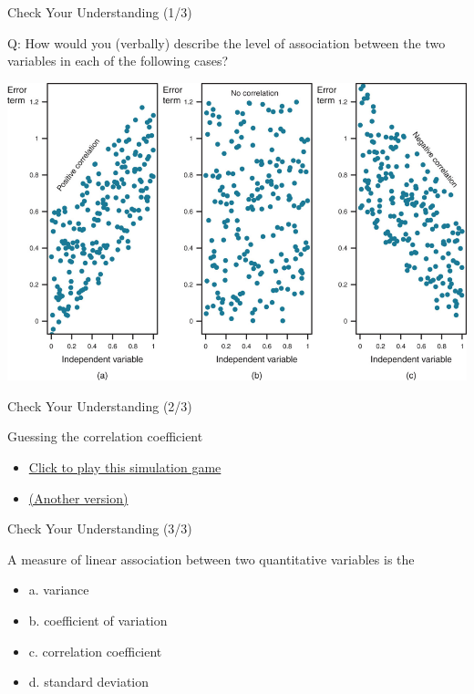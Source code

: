 \documentclass{beamer}
\begin{document}
\begin{frame}{Check Your Understanding (1/3)}
\vspace{0.2 cm}

\begin{center}

Q: How would you (verbally) describe the level of association between the two variables in each of the following cases?
\vspace{0.5 cm}

\includegraphics[scale=0.5]{images/correlationsAllSorts.png}
\end{center}

\end{frame}



\begin{frame}{Check Your Understanding (2/3)}

Guessing the correlation coefficient

\begin{itemize}
\item \href{https://www.rossmanchance.com/applets/GuessCorrelation.html}{Click to play this simulation game}
\item \href{https://istics.net/Correlations/}{(Another version)}

\end{itemize}
\end{frame}

\begin{frame}{Check Your Understanding (3/3)}

A measure of linear association between two quantitative variables is the

\begin{itemize}
\item a. variance
\item b. coefficient of variation
\item c. correlation coefficient
\item d. standard deviation

\end{itemize}

\end{frame}
\end{document}
